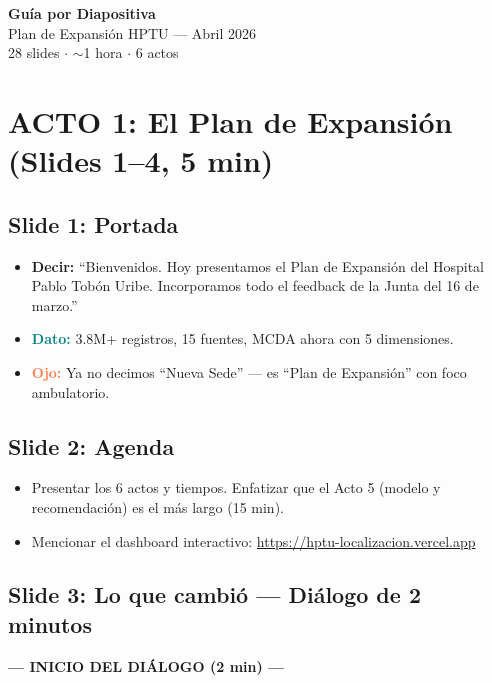 \documentclass[11pt, a4paper]{article}
\newcommand{\slide}[2]{\subsection{Slide #1: #2}}
\newcommand{\say}[1]{\textcolor{hptu}{\textbf{Decir:}} ``#1''}
\newcommand{\dato}[1]{\textcolor{teal}{\textbf{Dato:}} #1}
\newcommand{\warn}[1]{\textcolor{coral}{\textbf{Ojo:}} #1}
\begin{document}
{\Huge\bfseries\color{hptu} Guía por Diapositiva}\\[6pt]
{\Large Plan de Expansión HPTU --- Abril 2026}\\[4pt]
{\normalsize 28 slides $\cdot$ $\sim$1 hora $\cdot$ 6 actos}\\[12pt]

\section{ACTO 1: El Plan de Expansión (Slides 1--4, 5 min)}

\slide{1}{Portada}
\begin{itemize}[leftmargin=1cm]
  \item \say{Bienvenidos. Hoy presentamos el Plan de Expansión del Hospital Pablo Tobón Uribe. Incorporamos todo el feedback de la Junta del 16 de marzo.}
  \item \dato{3.8M+ registros, 15 fuentes, MCDA ahora con 5 dimensiones.}
  \item \warn{Ya no decimos ``Nueva Sede'' --- es ``Plan de Expansión'' con foco ambulatorio.}
\end{itemize}

\slide{2}{Agenda}
\begin{itemize}[leftmargin=1cm]
  \item Presentar los 6 actos y tiempos. Enfatizar que el Acto 5 (modelo y recomendación) es el más largo (15 min).
  \item Mencionar el dashboard interactivo: \url{https://hptu-localizacion.vercel.app}
\end{itemize}

\slide{3}{Lo que cambió --- Diálogo de 2 minutos}

{\small\textcolor{hptu}{\textbf{--- INICIO DEL DIÁLOGO (2 min) ---}}}
\end{document}
